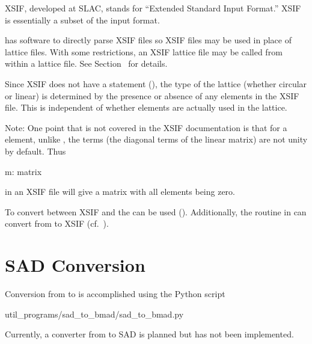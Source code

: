 XSIF\cite{b:xsif}, developed at SLAC, stands for ``Extended Standard
Input Format.''  XSIF is essentially a subset of the
\mad\cite{b:maduser} input format.

\bmad has software to directly parse XSIF files so XSIF files may be
used in place of \bmad lattice files.  With some restrictions, an XSIF
lattice file may be called from within a \bmad lattice file. See
Section~ for details.

Since XSIF does not have a  statement
(), the type of the lattice (whether circular or linear)
is determined by the presence or absence of any  elements
in the XSIF file. This is independent of whether  elements
are actually used in the lattice.

Note: One point that is not covered in the XSIF documentation is that
for a  element, unlike \mad, the  terms (the
diagonal terms of the linear matrix) are not unity by default. Thus
\begin{example}
  m: matrix
\end{example}
in an XSIF file will give a matrix with all elements being zero.

To convert between XSIF and \bmad the  can be used (). Additionally, the
 routine in \bmad can convert from \bmad to
XSIF (cf.~).

%

\section{SAD Conversion}
\label{s:sad.convert}

Conversion from \cite{b:sad} to \bmad is accomplished using the Python script
\begin{example}
  util_programs/sad_to_bmad/sad_to_bmad.py
\end{example}
Currently, a converter from \bmad to SAD is planned but has not been implemented.

